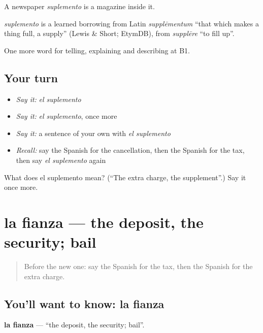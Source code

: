 A newspaper \emph{suplemento} is a magazine inside it.

\begin{cousinweb}
\emph{suplemento} is a learned borrowing from Latin \emph{supplēmentum} \textquotedblleft{}that which makes a thing full, a supply\textquotedblright{} (Lewis \& Short; EtymDB), from \emph{supplēre} \textquotedblleft{}to fill up\textquotedblright{}.
\end{cousinweb}

\begin{grammarlens}[title={What you've built}]
One more word for telling, explaining and describing at B1.
\end{grammarlens}

\subsection*{Your turn}
\begin{itemize}
\raggedright
  \item \emph{Say it:} \emph{el suplemento}
  \item \emph{Say it:} \emph{el suplemento}, once more
  \item \emph{Say it:} a sentence of your own with \emph{el suplemento}
  \item \emph{Recall:} say the Spanish for the cancellation, then the Spanish for the tax, then say \emph{el suplemento} again
\end{itemize}

\begin{tcolorbox}[breakable,colback=teal!4,colframe=teal!35!black,title={Before you move on}]
What does el suplemento mean? (\textquotedblleft{}The extra charge, the supplement\textquotedblright{}.) Say it once more.
\end{tcolorbox}
\section[la fianza]{la fianza — the deposit, the security; bail}

\label{lesson:ES-C663-fianza}



\begin{quote}
Before the new one: say the Spanish for the tax, then the Spanish for the extra charge.
\end{quote}

\subsection*{You'll want to know: la fianza}
\textbf{la fianza} — \textquotedblleft{}the deposit, the security; bail\textquotedblright{}.

